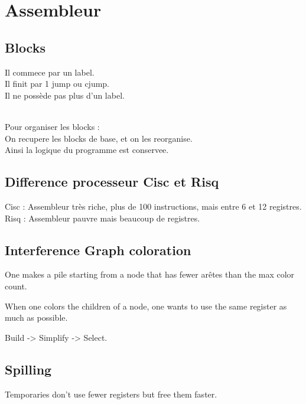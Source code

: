 \documentclass[a4paper,11pt]{article}
\begin{document}
\section{Assembleur}
\subsection{Blocks}
Il commece par un label.\\
Il finit par 1 jump ou cjump.\\
Il ne possède pas plus d'un label.\\

\

Pour organiser les blocks :\\
On recupere les blocks de base, et on les reorganise.\\
Ainsi la logique du programme est conservee.\\

\subsection{Difference processeur Cisc et Risq }
Cisc : Assembleur très riche, plus de 100 instructions, mais entre 6 et 12 registres.\\
Risq : Assembleur pauvre mais beaucoup de registres.\\

\subsection{Interference Graph coloration}

One makes a pile starting from a node that has fewer arêtes than the max color
count.

When one colors the children of a node, one wants to use the same register as
much as possible.

Build -> Simplify -> Select.

\subsection{Spilling}

Temporaries don't use fewer registers but free them faster.
\end{document}
